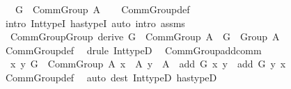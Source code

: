 \begin{isabellebody}
\ \ \ {\isachardoublequoteopen}G\ {\isacharcolon}{\kern0pt}\ Comm{\isacharunderscore}{\kern0pt}Group\ A{\isachardoublequoteclose}\isanewline
%
\isadelimproof
\ \ %
\endisadelimproof
%
\isatagproof
{}\isamarkupfalse%
\ Comm{\isacharunderscore}{\kern0pt}Group{\isacharunderscore}{\kern0pt}def\isanewline
\ \ \isamarkupfalse%
\ {\isacharparenleft}{\kern0pt}intro\ Int{\isacharunderscore}{\kern0pt}typeI\ has{\isacharunderscore}{\kern0pt}typeI{\isacharparenright}{\kern0pt}\ {\isacharparenleft}{\kern0pt}auto\ intro{\isacharcolon}{\kern0pt}\ assms{\isacharparenright}{\kern0pt}%
\endisatagproof
{\isafoldproof}%
%
\isadelimproof
\isanewline
%
\endisadelimproof
\isanewline
{}\isamarkupfalse%
\ \ Comm{\isacharunderscore}{\kern0pt}Group{\isacharunderscore}{\kern0pt}Group\ {\isacharbrackleft}{\kern0pt}derive{\isacharbrackright}{\kern0pt}{\isacharcolon}{\kern0pt}\ {\isachardoublequoteopen}G\ {\isacharcolon}{\kern0pt}\ Comm{\isacharunderscore}{\kern0pt}Group\ A\ {\isasymLongrightarrow}\ G\ {\isacharcolon}{\kern0pt}\ Group\ A{\isachardoublequoteclose}\isanewline
%
\isadelimproof
\ \ %
\endisadelimproof
%
\isatagproof
{}\isamarkupfalse%
\ Comm{\isacharunderscore}{\kern0pt}Group{\isacharunderscore}{\kern0pt}def\ \isamarkupfalse%
\ {\isacharparenleft}{\kern0pt}drule\ Int{\isacharunderscore}{\kern0pt}typeD{}{\isacharparenright}{\kern0pt}%
\endisatagproof
{\isafoldproof}%
%
\isadelimproof
\isanewline
%
\endisadelimproof
\isanewline
{}\isamarkupfalse%
\ \ Comm{\isacharunderscore}{\kern0pt}Group{\isacharunderscore}{\kern0pt}add{\isacharunderscore}{\kern0pt}comm{\isacharcolon}{\kern0pt}\isanewline
\ \ {\isachardoublequoteopen}{\isasymAnd}x\ y{\isachardot}{\kern0pt}\ {\isasymlbrakk}G\ {\isacharcolon}{\kern0pt}\ Comm{\isacharunderscore}{\kern0pt}Group\ A{\isacharsemicolon}{\kern0pt}\ x\ {\isacharcolon}{\kern0pt}\ A{\isacharsemicolon}{\kern0pt}\ y\ {\isacharcolon}{\kern0pt}\ A{\isasymrbrakk}\ {\isasymLongrightarrow}\ add\ G\ x\ y\ {\isacharequal}{\kern0pt}\ add\ G\ y\ x{\isachardoublequoteclose}\isanewline
%
\isadelimproof
\ \ %
\endisadelimproof
%
\isatagproof
{}\isamarkupfalse%
\ Comm{\isacharunderscore}{\kern0pt}Group{\isacharunderscore}{\kern0pt}def\ \isamarkupfalse%
\ {\isacharparenleft}{\kern0pt}auto\ dest{\isacharcolon}{\kern0pt}\ Int{\isacharunderscore}{\kern0pt}typeD{}\ has{\isacharunderscore}{\kern0pt}typeD{\isacharparenright}{\kern0pt}%
\endisatagproof
{\isafoldproof}%

\end{isabellebody}
